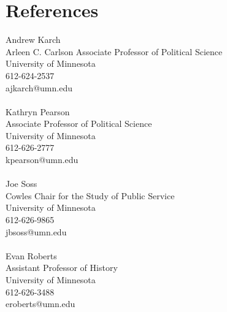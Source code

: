 \documentclass[12pt, letter]{article}
\begin{document}


\section*{References}
\begin{multicols}{2}
	Andrew Karch \\
	Arleen C. Carlson Associate Professor of Political Science \\
	University of Minnesota \\
	612-624-2537 \\
	ajkarch@umn.edu \\
	\\
	Kathryn Pearson \\
	Associate Professor of Political Science \\
	University of Minnesota \\
	612-626-2777 \\
	kpearson@umn.edu\\
	\\
	Joe Soss \\
	Cowles Chair for the Study of Public Service \\
	University of Minnesota \\
	612-626-9865 \\
	jbsoss@umn.edu \\
	\\
	Evan Roberts \\
	Assistant Professor of History \\
	University of Minnesota \\
	612-626-3488 \\
	eroberts@umn.edu
\end{multicols}

\end{document}
